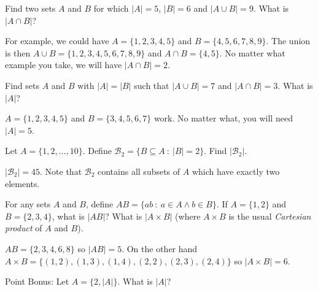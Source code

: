 \documentclass[11pt]{exam}
\def\st{~:~}
\begin{document}
\begin{questions}
\question Find two sets $A$ and $B$ for which $|A| = 5$, $|B| = 6$ and $|A\cup B| = 9$.  What is $|A \cap B|$?
\begin{solution}
For example, we could have $A = \{1,2,3,4,5\}$ and $B = \{4,5,6,7,8,9\}$.  The union is then $A \cup B = \{1,2,3,4,5,6,7,8,9\}$ and $A \cap B = \{4,5\}$.  No matter what example you take, we will have $|A \cap B| = 2$.
\end{solution}
\vfill
\question Find sets $A$ and $B$ with $|A| = |B|$ such that $|A\cup B| = 7$ and $|A \cap B| = 3$.  What is $|A|$?
\begin{solution}
$A = \{1,2,3,4,5\}$ and $B = \{3,4,5,6,7\}$ work.  No matter what, you will need $|A| = 5$.
\end{solution}
\vfill
\newpage
\question Let $A = \{1,2,\ldots, 10\}$.  Define $\mathcal{B}_2 = \{B \subseteq A \st |B| = 2\}$.  Find $|\mathcal{B}_2|$.
\begin{solution}
$|\mathcal{B}_2| = 45$.  Note that $\mathcal{B}_2$ contains all subsets of $A$ which have exactly two elements.
\end{solution}
\vfill
\question For any sets $A$ and $B$, define $AB = \{ab \st a\in A \wedge b \in B\}$.  If $A = \{1,2\}$ and $B = \{2,3,4\}$, what is $|AB|$?  What is $|A \times B|$ (where $A \times B$ is the usual {\em Cartesian product} of $A$ and $B$).
\begin{solution}
$AB = \{2, 3, 4, 6, 8\}$ so $|AB| = 5$.  On the other hand\\ $A \times B = \{(1,2), (1,3), (1,4), (2,2), (2,3), (2,4)\}$ so $|A \times B| = 6$.
\end{solution}
\vfill

 Point Bonus: Let $A = \{2, |A|\}$.  What is $|A|$?
\end{questions}
%
\end{document}
